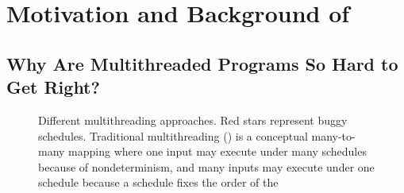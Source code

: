 \chapter{Motivation and Background of \smt} \label{sec:smt-motivation}

\section{Why Are Multithreaded Programs So Hard to Get Right?} \label{sec:smt-why}

\begin{figure}[t]
\begin{center}
\vspace{-.05in}
\caption{Different multithreading approaches. Red stars represent buggy
  schedules.  Traditional multithreading ()
  is a conceptual many-to-many mapping where one input may execute under
  many schedules because of nondeterminism, and many inputs may execute
  under one schedule because a schedule fixes the order of the
}
\end{center}
\end{figure}
